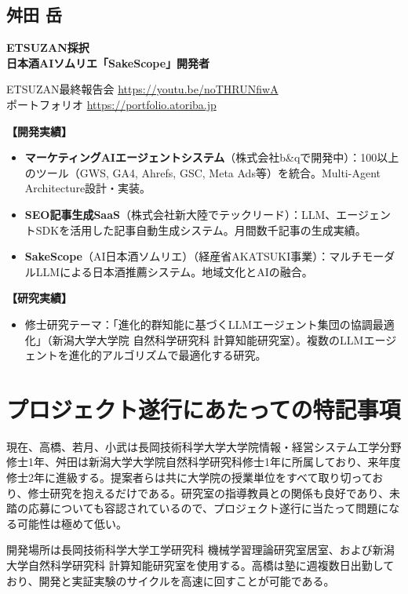 \documentclass[paper=a4,fontsize=10.5bp,jafontsize=10.5bp,twocolumn]{jlreq}
\begin{document}
\subsection*{舛田 岳}

\noindent\textbf{ETSUZAN採択}\\
\textbf{日本酒AIソムリエ「SakeScope」開発者}

{\small\sffamily
\noindent
ETSUZAN最終報告会 \url{https://youtu.be/noTHRUNfiwA}\\
ポートフォリオ \url{https://portfolio.atoriba.jp}
}

\textbf{【開発実績】}
\begin{itemize}
  \item \textbf{マーケティングAIエージェントシステム}（株式会社b\&qで開発中）：100以上のツール（GWS, GA4, Ahrefs, GSC, Meta Ads等）を統合。Multi-Agent Architecture設計・実装。
  \item \textbf{SEO記事生成SaaS}（株式会社新大陸でテックリード）：LLM、エージェントSDKを活用した記事自動生成システム。月間数千記事の生成実績。
  \item \textbf{SakeScope}（AI日本酒ソムリエ）（経産省AKATSUKI事業）：マルチモーダルLLMによる日本酒推薦システム。地域文化とAIの融合。
\end{itemize}

\textbf{【研究実績】}
\begin{itemize}
  \item 修士研究テーマ：「進化的群知能に基づくLLMエージェント集団の協調最適化」（新潟大学大学院 自然科学研究科 計算知能研究室）。複数のLLMエージェントを進化的アルゴリズムで最適化する研究。
\end{itemize}

\section{プロジェクト遂行にあたっての特記事項}

現在、高橋、若月、小武は長岡技術科学大学大学院情報・経営システム工学分野修士1年、舛田は新潟大学大学院自然科学研究科修士1年に所属しており、来年度修士2年に進級する。提案者らは共に大学院の授業単位をすべて取り切っており、修士研究を抱えるだけである。研究室の指導教員との関係も良好であり、未踏の応募についても容認されているので、プロジェクト遂行に当たって問題になる可能性は極めて低い。

開発場所は長岡技術科学大学工学研究科 機械学習理論研究室居室、および新潟大学自然科学研究科 計算知能研究室を使用する。高橋は塾に週複数日出勤しており、開発と実証実験のサイクルを高速に回すことが可能である。
\end{document}
